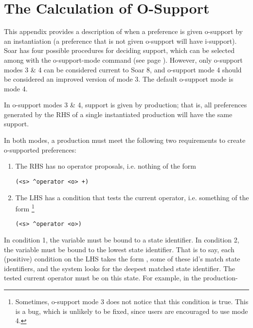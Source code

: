 \chapter{The Calculation of O-Support}
\label{SUPPORT}

This appendix provides a description of when a preference is given o-support by an instantiation (a preference that is not given o-support will have i-support). 
Soar has four possible procedures for deciding support, which can be selected among with the o-support-mode command (see page \pageref{o-support-mode}). However, only o-support modes 3 \& 4 can be considered current to Soar 8, and o-support mode 4 should be considered an improved version of mode 3.   The default o-support mode is mode 4.

In o-support modes 3 \& 4, support is given by production; that is, all preferences generated by the RHS of a single instantiated production will have the same support. 


In both modes, a production must meet the following two requirements to create o-supported preferences:
\begin{enumerate}
\item The RHS has no operator proposals, i.e. nothing of the form \begin{verbatim}(<s> ^operator <o> +) \end{verbatim}
\item The LHS has a condition that tests the current operator, i.e. something of the form
\footnote{Sometimes, o-support mode 3 does not notice that this condition is true. This is a bug, which is unlikely to be fixed, since users are encouraged to use mode 4.}
\begin{verbatim}(<s> ^operator <o>)\end{verbatim}
\end{enumerate}



In condition 1, the variable  must be bound to a state identifier.
In condition 2, the variable  must be bound to the lowest state identifier. That is to say, each (positive) condition on the LHS takes the form , some of these id's match state identifiers, and the system looks for the deepest matched state identifier. The tested current operator must be on this state. For example, in the production-

